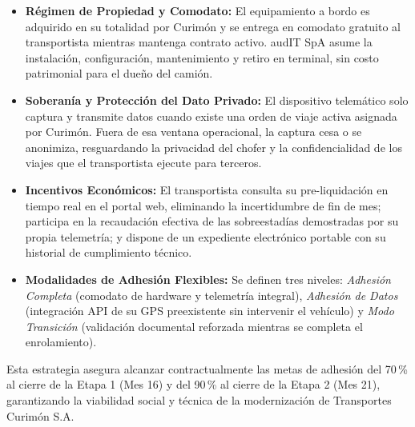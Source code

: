 \begin{itemize}
  \item \textbf{Régimen de Propiedad y Comodato:} El equipamiento a bordo es adquirido en su totalidad por Curimón
   y se entrega en comodato gratuito al transportista mientras mantenga contrato activo. audIT SpA asume la
  instalación, configuración, mantenimiento y retiro en terminal, sin costo patrimonial para el dueño del camión.
  \item \textbf{Soberanía y Protección del Dato Privado:} El dispositivo telemático solo captura y transmite datos cuando
  existe una orden de viaje activa asignada por Curimón. Fuera de esa ventana operacional, la captura cesa o se anonimiza,
  resguardando la privacidad del chofer y la confidencialidad de los viajes que el transportista ejecute para terceros.
  \item \textbf{Incentivos Económicos:} El transportista consulta su pre-liquidación en tiempo real en el
  portal web, eliminando la incertidumbre de fin de mes; participa en la recaudación efectiva de las sobreestadías demostradas
  por su propia telemetría; y dispone de un expediente electrónico portable con su historial de cumplimiento técnico.
  \item \textbf{Modalidades de Adhesión Flexibles:} Se definen tres niveles: \textit{Adhesión Completa} (comodato de hardware
  y telemetría integral), \textit{Adhesión de Datos} (integración API de su GPS preexistente sin intervenir el vehículo) y
  \textit{Modo Transición} (validación documental reforzada mientras se completa el enrolamiento).
\end{itemize}

Esta estrategia asegura alcanzar contractualmente las metas de adhesión del 70\,\% al cierre de la Etapa 1 (Mes 16) y del
90\,\% al cierre de la Etapa 2 (Mes 21), garantizando la viabilidad social y técnica de la modernización de Transportes Curimón S.A.
